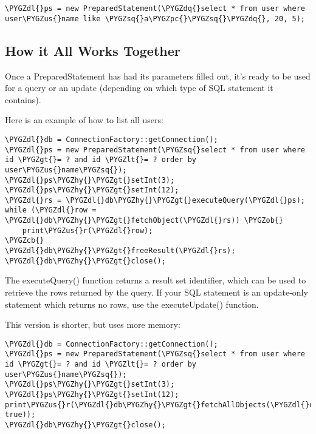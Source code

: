 \documentclass[letterpaper,10pt,english]{sphinxmanual}
\def\PYGZus{\char`\_}
\def\PYGZob{\char`\{}
\def\PYGZcb{\char`\}}
\def\PYGZlt{\char`\<}
\def\PYGZgt{\char`\>}
\def\PYGZpc{\char`\%}
\def\PYGZdl{\char`\$}
\def\PYGZhy{\char`\-}
\def\PYGZsq{\char`\'}
\def\PYGZdq{\char`\"}
\renewcommand\PYGZsq{\textquotesingle}
\begin{document}
\begin{Verbatim}[commandchars=\\\{\}]
\PYGZdl{}ps = new PreparedStatement(\PYGZdq{}select * from user where user\PYGZus{}name like \PYGZsq{}a\PYGZpc{}\PYGZsq{}\PYGZdq{}, 20, 5);
\end{Verbatim}


\subsection{How it All Works Together}
\label{jaxFrameworkGuide:how-it-all-works-together}
Once a PreparedStatement has had its parameters filled out, it's ready to be used for a query or an
update (depending on which type of SQL statement it contains).

Here is an example of how to list all users:

\begin{Verbatim}[commandchars=\\\{\}]
\PYGZdl{}db = ConnectionFactory::getConnection();
\PYGZdl{}ps = new PreparedStatement(\PYGZsq{}select * from user where id \PYGZgt{}= ? and id \PYGZlt{}= ? order by user\PYGZus{}name\PYGZsq{});
\PYGZdl{}ps\PYGZhy{}\PYGZgt{}setInt(3);
\PYGZdl{}ps\PYGZhy{}\PYGZgt{}setInt(12);
\PYGZdl{}rs = \PYGZdl{}db\PYGZhy{}\PYGZgt{}executeQuery(\PYGZdl{}ps);
while (\PYGZdl{}row = \PYGZdl{}db\PYGZhy{}\PYGZgt{}fetchObject(\PYGZdl{}rs)) \PYGZob{}
    print\PYGZus{}r(\PYGZdl{}row);
\PYGZcb{}
\PYGZdl{}db\PYGZhy{}\PYGZgt{}freeResult(\PYGZdl{}rs);
\PYGZdl{}db\PYGZhy{}\PYGZgt{}close();
\end{Verbatim}

The executeQuery() function returns a result set identifier, which can be used to retrieve the rows
returned by the query.  If your SQL statement is an update-only statement which returns no rows, use
the executeUpdate() function.

This version is shorter, but uses more memory:

\begin{Verbatim}[commandchars=\\\{\}]
\PYGZdl{}db = ConnectionFactory::getConnection();
\PYGZdl{}ps = new PreparedStatement(\PYGZsq{}select * from user where id \PYGZgt{}= ? and id \PYGZlt{}= ? order by user\PYGZus{}name\PYGZsq{});
\PYGZdl{}ps\PYGZhy{}\PYGZgt{}setInt(3);
\PYGZdl{}ps\PYGZhy{}\PYGZgt{}setInt(12);
print\PYGZus{}r(\PYGZdl{}db\PYGZhy{}\PYGZgt{}fetchAllObjects(\PYGZdl{}db\PYGZhy{}\PYGZgt{}executeQuery(\PYGZdl{}ps), true));
\PYGZdl{}db\PYGZhy{}\PYGZgt{}close();
\end{Verbatim}
\end{document}
